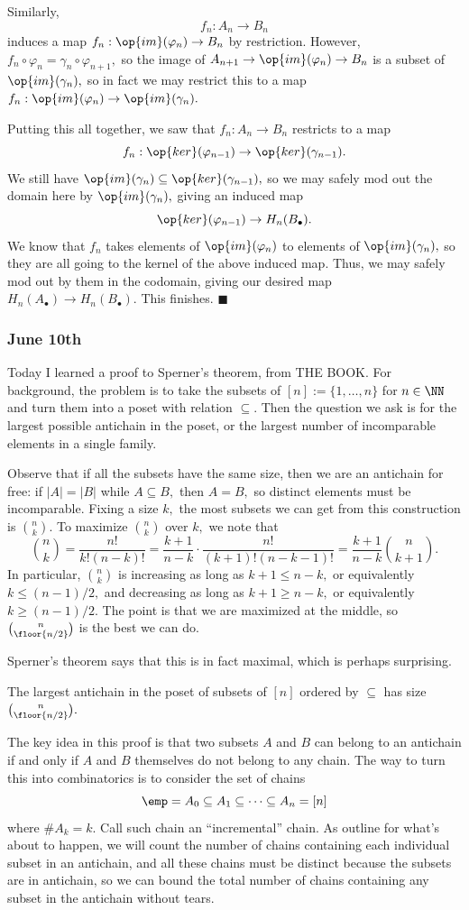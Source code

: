 Similarly,
\[f_n:A_n\to B_n\]
induces a map $f_n:\op{im}(\varphi_n)\to B_n$ by restriction. However, $f_n\circ\varphi_n=\gamma_n\circ\varphi_{n+1},$ so the image of $A_{n+1}\to\op{im}(\varphi_n)\to B_n$ is a subset of $\op{im}(\gamma_n),$ so in fact we may restrict this to a map $f_n:\op{im}(\varphi_n)\to\op{im}(\gamma_n).$

Putting this all together, we saw that $f_n:A_n\to B_n$ restricts to a map
\[f_n:\op{ker}(\varphi_{n-1})\to\op{ker}(\gamma_{n-1}).\]
We still have $\op{im}(\gamma_n)\subseteq\op{ker}(\gamma_{n-1}),$ so we may safely mod out the domain here by $\op{im}(\gamma_n),$ giving an induced map
\[\op{ker}(\varphi_{n-1})\to H_n(B_\bullet).\]
We know that $f_n$ takes elements of $\op{im}(\varphi_n)$ to elements of $\op{im}(\gamma_n),$ so they are all going to the kernel of the above induced map. Thus, we may safely mod out by them in the codomain, giving our desired map $H_n(A_\bullet)\to H_n(B_\bullet).$ This finishes. $\blacksquare$

\subsubsection{June 10th}
Today I learned a proof to Sperner's theorem, from THE BOOK. For background, the problem is to take the subsets of $[n]:=\{1,\ldots,n\}$ for $n\in\NN$ and turn them into a poset with relation $\subseteq.$ Then the question we ask is for the largest possible antichain in the poset, or the largest number of incomparable elements in a single family.

Observe that if all the subsets have the same size, then we are an antichain for free: if $|A|=|B|$ while $A\subseteq B,$ then $A=B,$ so distinct elements must be incomparable. Fixing a size $k,$ the most subsets we can get from this construction is $\binom nk.$ To maximize $\binom nk$ over $k,$ we note that
\[\binom nk=\frac{n!}{k!(n-k)!}=\frac{k+1}{n-k}\cdot\frac{n!}{(k+1)!(n-k-1)!}=\frac{k+1}{n-k}\binom n{k+1}.\]
In particular, $\binom nk$ is increasing as long as $k+1\le n-k,$ or equivalently $k\le(n-1)/2,$ and decreasing as long as $k+1\ge n-k,$ or equivalently $k\ge(n-1)/2.$ The point is that we are maximized at the middle, so $\binom n{\floor{n/2}}$ is the best we can do.

Sperner's theorem says that this is in fact maximal, which is perhaps surprising.
\begin{theorem}
    The largest antichain in the poset of subsets of $[n]$ ordered by $\subseteq$ has size $\binom n{\floor{n/2}}.$
\end{theorem}
The key idea in this proof is that two subsets $A$ and $B$ can belong to an antichain if and only if $A$ and $B$ themselves do not belong to any chain. The way to turn this into combinatorics is to consider the set of chains
\[\emp=A_0\subseteq A_1\subseteq\cdots\subseteq A_n=[n]\]
where $\#A_k=k.$ Call such chain an ``incremental'' chain. As outline for what's about to happen, we will count the number of chains containing each individual subset in an antichain, and all these chains must be distinct because the subsets are in antichain, so we can bound the total number of chains containing any subset in the antichain without tears.

